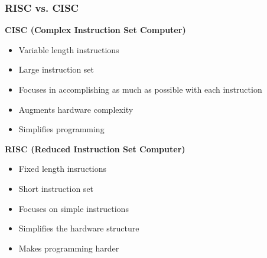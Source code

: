 \subsubsection{\acs{RISC} vs. \acs{CISC}}
\begin{multicols}{2}
	\textbf{\acs{CISC} (Complex Instruction Set Computer)}
		\begin{itemize}
			\item Variable length instructions
			\item Large instruction set
			\item Focuses in accomplishing as much as possible with each instruction
			\item Augments hardware complexity
			\item Simplifies programming
		\end{itemize} 
          \columnbreak
	\textbf{\acs{RISC} (Reduced Instruction Set Computer)}
		\begin{itemize}
			\item Fixed length insructions
			\item Short instruction set
			\item Focuses on simple instructions
			\item Simplifies the hardware structure
			\item Makes programming harder
		\end{itemize}      
\end{multicols}
\clearpage


